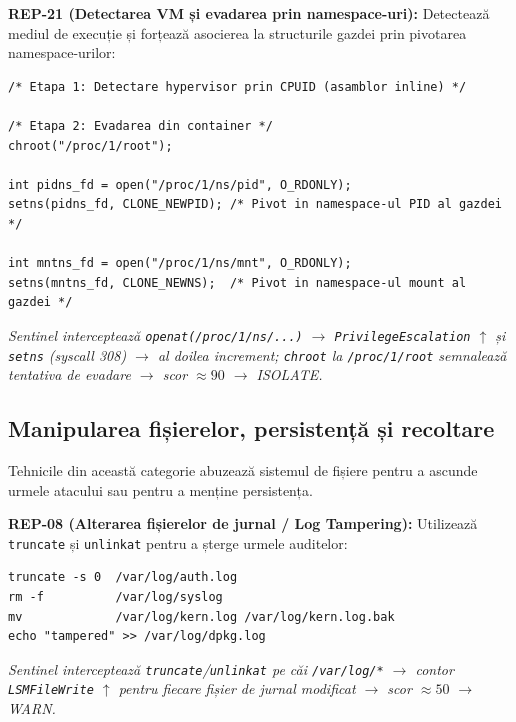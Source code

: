 \par \textbf{REP-21 (Detectarea VM și evadarea prin namespace-uri):} Detectează mediul de execuție și forțează asocierea la structurile gazdei prin pivotarea namespace-urilor:

\begin{lstlisting}[style=cstyle,caption={REP-21: Evadarea din container via namespace pivot}]
/* Etapa 1: Detectare hypervisor prin CPUID (asamblor inline) */

/* Etapa 2: Evadarea din container */
chroot("/proc/1/root");

int pidns_fd = open("/proc/1/ns/pid", O_RDONLY);
setns(pidns_fd, CLONE_NEWPID); /* Pivot in namespace-ul PID al gazdei */

int mntns_fd = open("/proc/1/ns/mnt", O_RDONLY);
setns(mntns_fd, CLONE_NEWNS);  /* Pivot in namespace-ul mount al gazdei */
\end{lstlisting}
\par\textit{Sentinel interceptează \texttt{openat(\textquotedbl/proc/1/ns/...\textquotedbl)} $\rightarrow$ \texttt{PrivilegeEscalation} $\uparrow$ și \texttt{setns} (syscall 308) $\rightarrow$ al doilea increment; \texttt{chroot} la \texttt{/proc/1/root} semnalează tentativa de evadare $\rightarrow$ scor $\approx 90$ $\rightarrow$ ISOLATE.}

\subsection{Manipularea fișierelor, persistență și recoltare}
\label{subsec:attack_files}

\par Tehnicile din această categorie abuzează sistemul de fișiere pentru a ascunde urmele atacului sau pentru a menține persistența.

\par \textbf{REP-08 (Alterarea fișierelor de jurnal / Log Tampering):} Utilizează \texttt{truncate} și \texttt{unlinkat} pentru a șterge urmele auditelor:

\begin{lstlisting}[style=bashstyle,caption={REP-08: Alterarea fișierelor log în Bash}]
truncate -s 0  /var/log/auth.log
rm -f          /var/log/syslog
mv             /var/log/kern.log /var/log/kern.log.bak
echo "tampered" >> /var/log/dpkg.log
\end{lstlisting}
\par\textit{Sentinel interceptează \texttt{truncate}/\texttt{unlinkat} pe căi \texttt{/var/log/*} $\rightarrow$ contor \texttt{LSMFileWrite} $\uparrow$ pentru fiecare fișier de jurnal modificat $\rightarrow$ scor $\approx 50$ $\rightarrow$ WARN.}

